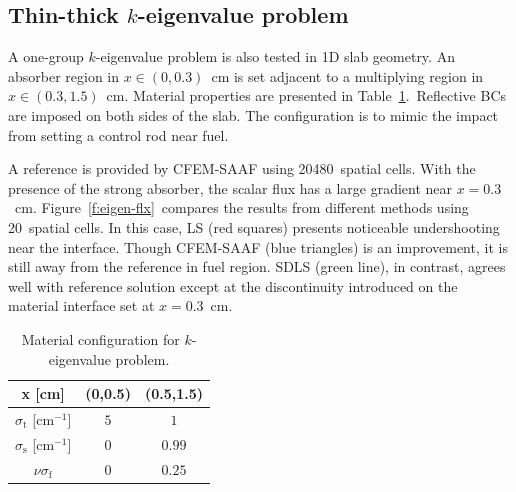 \documentclass[review]{elsarticle}
\newcommand{\st}{\sigma_\mathrm{t}}
\newcommand{\e}[1]{\ensuremath{\times 10^{#1}}}
\newcommand{\sigs}{\sigma_\mathrm{s}}
\begin{document}
%	

\subsection{Thin-thick $k$-eigenvalue problem}
{A one-group $k$-eigenvalue problem is also tested in 1D slab geometry. An absorber region in $x\in(0,0.3)$\ cm is set adjacent to a multiplying region in $x\in(0.3,1.5)$\ cm. Material properties are presented in Table\ \ref{tb:eigen}.\ Reflective BCs are imposed on both sides of the slab. The configuration is to mimic the impact from setting a control rod near fuel. 
	
A reference is provided by CFEM-SAAF using 20480\ spatial cells. With the presence of the strong absorber, the scalar flux has a large gradient near $x=0.3$\ cm. Figure\ \ref{f:eigen-flx}\ compares the results from different methods using 20\ spatial cells. In this case, LS (red squares) presents noticeable undershooting near the interface. Though CFEM-SAAF (blue triangles) is an improvement, it is still away from the reference in fuel region. SDLS (green line), in contrast, agrees well with reference solution except at the discontinuity introduced on the material interface set at $x=0.3$\ cm.}

\begin{table}[ht!]
	\centering
	\caption{Material configuration for $k$-eigenvalue problem.}
	\label{tb:eigen}
	\hspace*{0cm}\begin{tabular}{|c|c|c|}
		\hline
		x [cm] & (0,0.5) & (0.5,1.5)\\
		\hline
		$\st$ [cm$^{-1}$]& $5$ & $1$\\
		\hline
		$\sigs$ [cm$^{-1}$]& $0$ & $0.99$\\
		\hline
		$\nu\sigma_\mathrm{f}$& $0$ & $0.25$\\
		\hline
	\end{tabular}
\end{table}
\end{document}
